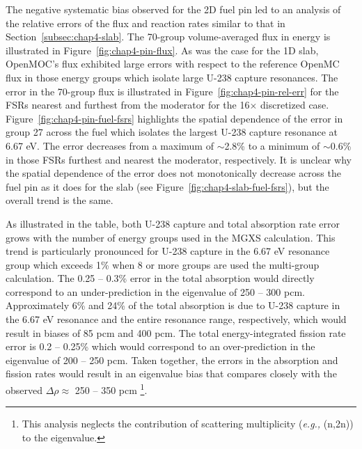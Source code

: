 The negative systematic bias observed for the 2D fuel pin led to an analysis of the relative errors of the flux and reaction rates similar to that in Section~\ref{subsec:chap4-slab}. The 70-group volume-averaged flux in energy is illustrated in Figure~\ref{fig:chap4-pin-flux}. As was the case for the 1D slab, OpenMOC's flux exhibited large errors with respect to the reference OpenMC flux in those energy groups which isolate large U-238 capture resonances. The error in the 70-group flux is illustrated in Figure~\ref{fig:chap4-pin-rel-err} for the \ac{FSR}s nearest and furthest from the moderator for the 16$\times$ discretized case. Figure~\ref{fig:chap4-pin-fuel-fsrs} highlights the spatial dependence of the error in group 27 across the fuel which isolates the largest U-238 capture resonance at 6.67 eV. The error decreases from a maximum of $\sim$2.8\% to a minimum of $\sim$0.6\% in those \ac{FSR}s furthest and nearest the moderator, respectively. It is unclear why the spatial dependence of the error does not monotonically decrease across the fuel pin as it does for the slab (see Figure~\ref{fig:chap4-slab-fuel-fsrs}), but the overall trend is the same.

As illustrated in the table, both U-238 capture and total absorption rate error grows with the number of energy groups used in the \ac{MGXS} calculation. This trend is particularly pronounced for U-238 capture in the 6.67 eV resonance group which exceeds 1\% when 8 or more groups are used the multi-group calculation. The 0.25 -- 0.3\% error in the total absorption would directly correspond to an under-prediction in the eigenvalue of 250 -- 300 pcm. Approximately 6\% and 24\% of the total absorption is due to U-238 capture in the 6.67 eV resonance and the entire resonance range, respectively, which would result in biases of 85 pcm and 400 pcm. The total energy-integrated fission rate error is 0.2 -- 0.25\% which would correspond to an over-prediction in the eigenvalue of 200 -- 250 pcm. Taken together, the errors in the absorption and fission rates would result in an eigenvalue bias that compares closely with the observed $\Delta\rho \approx$ 250 -- 350 pcm \footnote{This analysis neglects the contribution of scattering multiplicity (\textit{e.g.,} (n,2n)) to the eigenvalue.}.

